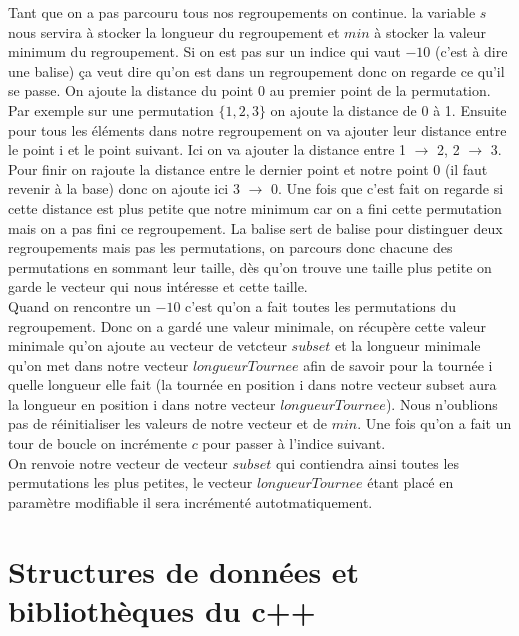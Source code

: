 \documentclass[a4paper,sffamily,12pt]{article}
\begin{document}
			\vspace{0.5cm}		
		
			 Tant que on a pas parcouru tous nos regroupements on continue. la variable $s$ nous servira à stocker la longueur du regroupement et $min$ à stocker la valeur minimum du regroupement. Si on est pas sur un indice qui vaut $-10$ (c'est à dire une balise) ça veut dire qu'on est dans un regroupement donc on regarde ce qu'il se passe. On ajoute la distance du point 0 au premier point de la permutation. Par exemple sur une permutation $\{1,2,3\}$ on ajoute la distance de 0 à 1. Ensuite  pour tous les éléments dans notre regroupement on va ajouter leur distance entre le point i et le point suivant. Ici on va ajouter la distance entre 1 $\rightarrow$ 2, 2 $\rightarrow$ 3. Pour finir on rajoute la distance entre le dernier point et notre point 0 (il faut revenir à la base) donc on ajoute ici 3 $\rightarrow$ 0. Une fois que c'est fait on regarde si cette distance est plus petite que notre minimum car on a fini cette permutation mais on a pas fini ce regroupement. La balise sert de balise pour distinguer deux regroupements mais pas les permutations, on parcours donc chacune des permutations en sommant leur taille, dès qu'on trouve une taille plus petite on garde le vecteur qui nous intéresse et cette taille. \\
			 \indent Quand on rencontre un $-10$ c'est qu'on a fait toutes les permutations du regroupement. Donc on a gardé une valeur minimale, on récupère cette valeur minimale qu'on ajoute au vecteur de vetcteur $subset$ et la longueur minimale qu'on met dans notre vecteur $longueurTournee$ afin de savoir pour la tournée i quelle longueur elle fait (la tournée en position i dans notre vecteur subset aura la longueur en position i dans notre vecteur $longueurTournee$). Nous n'oublions pas de réinitialiser les valeurs de notre vecteur et de $min$. Une fois qu'on a fait un tour de boucle on incrémente $c$ pour passer à l'indice suivant.  \\
			\indent On renvoie notre vecteur de vecteur  $subset$ qui contiendra ainsi toutes les permutations les plus petites, le vecteur $longueurTournee$ étant placé en paramètre modifiable il sera incrémenté autotmatiquement.



	\section{Structures de données et bibliothèques du c++}		
					
\end{document}
